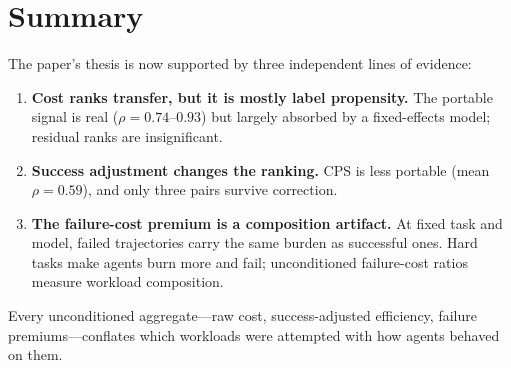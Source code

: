 \documentclass[11pt]{article}
\begin{document}
\section{Summary}

The paper's thesis is now supported by three independent lines of evidence:

\begin{enumerate}[nosep]
\item \textbf{Cost ranks transfer, but it is mostly label propensity.} The
  portable signal is real ($\rho = 0.74$--$0.93$) but largely absorbed by a
  fixed-effects model; residual ranks are insignificant.

\item \textbf{Success adjustment changes the ranking.} CPS is less portable
  (mean $\rho = 0.59$), and only three pairs survive correction.

\item \textbf{The failure-cost premium is a composition artifact.} At fixed
  task and model, failed trajectories carry the same burden as successful ones.
  Hard tasks make agents burn more and fail; unconditioned failure-cost ratios
  measure workload composition.
\end{enumerate}

Every unconditioned aggregate---raw cost, success-adjusted efficiency, failure
premiums---conflates which workloads were attempted with how agents behaved on
them.
\end{document}
